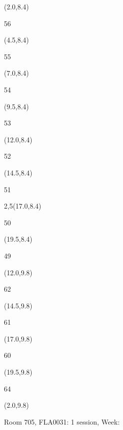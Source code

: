 \documentclass[a4paper]{article}
\newcommand{\myseat}[4]{%
\vspace{-0.1cm} \hspace{-0.5cm}
\parbox[t][2.2cm][t]{3.5cm}{%
\small #1 %
\begin{description}
\vspace{-0.1cm}
\item [ID:] #2
\vspace{-0.1cm}
\item [Team:] #3 \normalsize
\vspace{-0.1cm}
\item \normalsize #4
\vspace{-0.1cm}
\end{description}
}
}
\begin{document}
\begin{textblock}{2.5}(2.0,8.4)
\textblockcolor{}
\myseat{56}{}{}{}
\end{textblock}

\begin{textblock}{2.5}(4.5,8.4)
\textblockcolor{}
\myseat{55}{}{}{}
\end{textblock}

\begin{textblock}{2.5}(7.0,8.4)
\textblockcolor{}
\myseat{54}{}{}{}
\end{textblock}

\begin{textblock}{2.5}(9.5,8.4)
\textblockcolor{}
\myseat{53}{}{}{}
\end{textblock}

\begin{textblock}{2.5}(12.0,8.4)
\textblockcolor{}
\myseat{52}{}{}{}
\end{textblock}

\begin{textblock}{2.5}(14.5,8.4)
\textblockcolor{}
\myseat{51}{}{}{}
\end{textblock}

\begin{textblock}{2,5}(17.0,8.4)
\textblockcolor{}
\myseat{50}{}{}{}
\end{textblock}

\begin{textblock}{2.5}(19.5,8.4)
\textblockcolor{}
\myseat{49}{}{}{}
\end{textblock}


\begin{textblock}{2.5}(12.0,9.8)
\textblockcolor{}
\myseat{62}{}{}{}
\end{textblock}

\begin{textblock}{2.5}(14.5,9.8)
\textblockcolor{}
\myseat{61}{}{}{}
\end{textblock}

\begin{textblock}{2.5}(17.0,9.8)
\textblockcolor{}
\myseat{60}{}{}{}
\end{textblock}

\begin{textblock}{2.5}(19.5,9.8)
\textblockcolor{}
\myseat{64}{}{}{}
\end{textblock}

\begin{textblock}{10}(2.0,9.8)
\textblockcolor{}
\parbox[t][2.2cm][t]{9.5cm}{%
\large Room 705, FLA0031: 1 session, Week: 
\vspace{-0.3cm} \hspace{-0.5cm}
}
\end{textblock}
\end{document}
